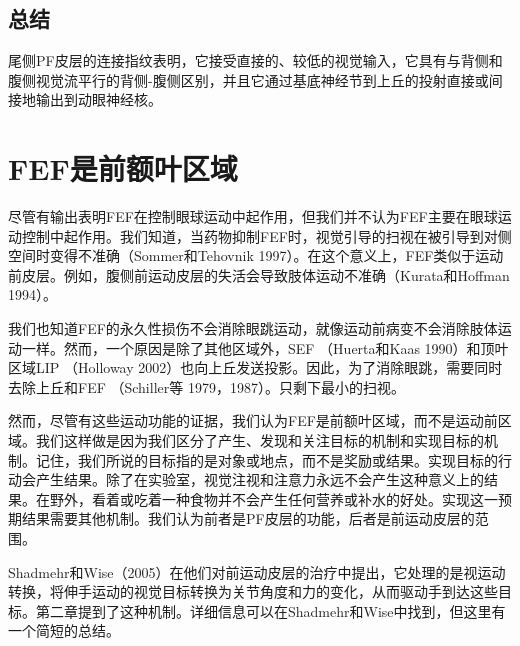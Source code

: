\subsection{总结}
尾侧PF皮层的连接指纹表明，它接受直接的、较低的视觉输入，它具有与背侧和腹侧视觉流平行的背侧-腹侧区别，并且它通过基底神经节到上丘的投射直接或间接地输出到动眼神经核。

\section{FEF是前额叶区域}
尽管有输出表明FEF在控制眼球运动中起作用，但我们并不认为FEF主要在眼球运动控制中起作用。我们知道，当药物抑制FEF时，视觉引导的扫视在被引导到对侧空间时变得不准确（Sommer和Tehovnik 1997）。在这个意义上，FEF类似于运动前皮层。例如，腹侧前运动皮层的失活会导致肢体运动不准确（Kurata和Hoffman 1994）。

我们也知道FEF的永久性损伤不会消除眼跳运动，就像运动前病变不会消除肢体运动一样。然而，一个原因是除了其他区域外，SEF （Huerta和Kaas 1990）和顶叶区域LIP （Holloway 2002）也向上丘发送投影。因此，为了消除眼跳，需要同时去除上丘和FEF （Schiller等 1979，1987）。只剩下最小的扫视。

然而，尽管有这些运动功能的证据，我们认为FEF是前额叶区域，而不是运动前区域。我们这样做是因为我们区分了产生、发现和关注目标的机制和实现目标的机制。记住，我们所说的目标指的是对象或地点，而不是奖励或结果。实现目标的行动会产生结果。除了在实验室，视觉注视和注意力永远不会产生这种意义上的结果。在野外，看着或吃着一种食物并不会产生任何营养或补水的好处。实现这一预期结果需要其他机制。我们认为前者是PF皮层的功能，后者是前运动皮层的范围。

Shadmehr和Wise（2005）在他们对前运动皮层的治疗中提出，它处理的是视运动转换，将伸手运动的视觉目标转换为关节角度和力的变化，从而驱动手到达这些目标。第二章提到了这种机制。详细信息可以在Shadmehr和Wise中找到，但这里有一个简短的总结。

